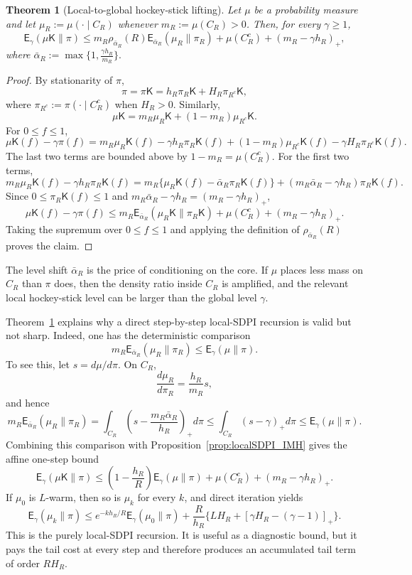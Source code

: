 \documentclass[10pt, journal]{IEEEtran}
\newcommand{\sK}{\mathsf{K}}
\newtheorem{theorem}{Theorem}
\begin{document}
\begin{theorem}[Local-to-global hockey-stick lifting]
\label{thm:Local_to_global}
Let $\mu$ be a probability measure and let $\mu_R:=\mu(\cdot\mid C_R)$ whenever $m_R:=\mu(C_R)>0$. Then, for every $\gamma\ge 1$,
$$\mathsf E_\gamma(\mu \sK\|\pi)\le m_R\rho_{\bar\alpha_R}(R)\mathsf E_{\bar\alpha_R}(\mu_R\|\pi_R)+\mu(C_R^c)+(m_R-\gamma h_R)_+,$$
where
$\bar\alpha_R:=\max\Big\{1,\frac{\gamma h_R}{m_R}\Big\}.$
\end{theorem}
\begin{proof}
By stationarity of $\pi$,
$$\pi=\pi \sK=h_R\pi_R\sK+H_R\pi_{R^c}\sK,$$
where $\pi_{R^c}:=\pi(\cdot\mid C_R^c)$ when $H_R>0$. Similarly,
$$\mu \sK=m_R\mu_R\sK+(1-m_R)\mu_{R^c}\sK.$$
For $0\le f\le 1$,
$$\mu \sK(f)-\gamma\pi(f)=m_R\mu_R\sK(f)-\gamma h_R\pi_R\sK(f)+(1-m_R)\mu_{R^c}\sK(f)-\gamma H_R\pi_{R^c}\sK(f).$$
The last two terms are bounded above by $1-m_R=\mu(C_R^c)$. For the first two terms,
$$m_R\mu_R\sK(f)-\gamma h_R\pi_R\sK(f)=m_R\{\mu_R\sK(f)-\bar\alpha_R\pi_R\sK(f)\}+(m_R\bar\alpha_R-\gamma h_R)\pi_R\sK(f).$$
Since $0\le\pi_R\sK(f)\le1$ and $m_R\bar\alpha_R-\gamma h_R=(m_R-\gamma h_R)_+$,
$$\mu \sK(f)-\gamma\pi(f)\le m_R\mathsf E_{\bar\alpha_R}(\mu_R\sK\|\pi_R\sK)+\mu(C_R^c)+(m_R-\gamma h_R)_+.$$
Taking the supremum over $0\le f\le 1$ and applying the definition of $\rho_{\bar\alpha_R}(R)$ proves the claim.
\end{proof}
The level shift $\bar\alpha_R$ is the price of conditioning on the core. If $\mu$ places less mass on $C_R$ than $\pi$ does, then the density ratio inside $C_R$ is amplified, and the relevant local hockey-stick level can be larger than the global level $\gamma$.

Theorem~\ref{thm:Local_to_global} explains why a direct step-by-step local-SDPI recursion is valid but not sharp. Indeed, one has the deterministic comparison
$$m_R\mathsf E_{\bar\alpha_R}(\mu_R\|\pi_R)\le \mathsf E_\gamma(\mu\|\pi).$$
To see this, let $s=d\mu/d\pi$. On $C_R$,
$$\frac{d\mu_R}{d\pi_R}=\frac{h_R}{m_R}s,$$
and hence
$$m_R\mathsf E_{\bar\alpha_R}(\mu_R\|\pi_R)=\int_{C_R}\left(s-\frac{m_R\bar\alpha_R}{h_R}\right)_+d\pi\le \int_{C_R}(s-\gamma)_+d\pi\le \mathsf E_\gamma(\mu\|\pi).$$
Combining this comparison with Proposition~\ref{prop:localSDPI_IMH} gives the affine one-step bound
$$\mathsf E_\gamma(\mu \sK\|\pi)\le \left(1-\frac{h_R}{R}\right)\mathsf E_\gamma(\mu\|\pi)+\mu(C_R^c)+(m_R-\gamma h_R)_+.$$
If $\mu_0$ is $L$-warm, then so is $\mu_k$ for every $k$, and direct iteration yields
$$\mathsf E_\gamma(\mu_k\|\pi)\le e^{-kh_R/R}\mathsf E_\gamma(\mu_0\|\pi)+\frac{R}{h_R}\{LH_R+[\gamma H_R-(\gamma-1)]_+\}.$$
This is the purely local-SDPI recursion. It is useful as a diagnostic bound, but it pays the tail cost at every step and therefore produces an accumulated tail term of order $RH_R$.
\end{document}
